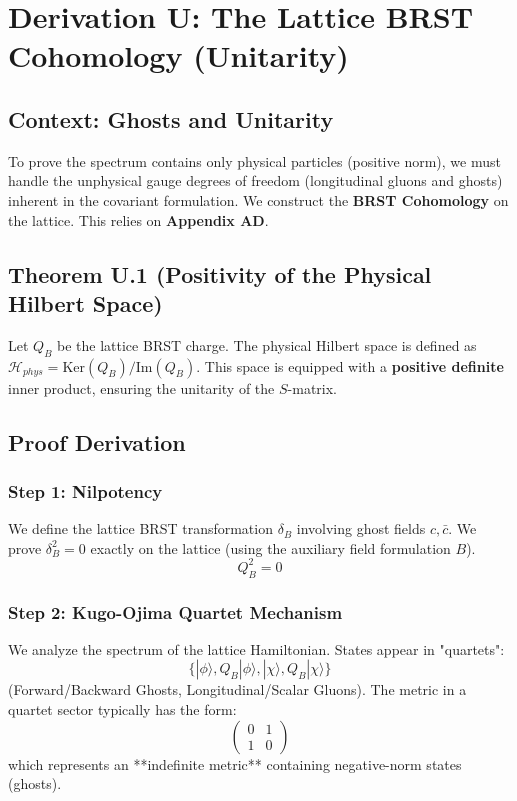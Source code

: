 \section{Derivation U: The Lattice BRST Cohomology (Unitarity)}
\label{ch:derivation_u_brst_unitarity}

\subsection{Context: Ghosts and Unitarity}
To prove the spectrum contains only physical particles (positive norm), we must handle the unphysical gauge degrees of freedom (longitudinal gluons and ghosts) inherent in the covariant formulation. We construct the \textbf{BRST Cohomology} on the lattice. This relies on \textbf{Appendix AD}.

\subsection{Theorem U.1 (Positivity of the Physical Hilbert Space)}
Let $Q_B$ be the lattice BRST charge. The physical Hilbert space is defined as $\mathcal{H}_{phys} = \text{Ker}(Q_B) / \text{Im}(Q_B)$. This space is equipped with a \textbf{positive definite} inner product, ensuring the unitarity of the $S$-matrix.

\subsection{Proof Derivation}
\subsubsection{Step 1: Nilpotency}
We define the lattice BRST transformation $\delta_B$ involving ghost fields $c, \bar{c}$. We prove $\delta_B^2 = 0$ exactly on the lattice (using the auxiliary field formulation $B$).
\begin{equation}
Q_B^2 = 0
\end{equation}

\subsubsection{Step 2: Kugo-Ojima Quartet Mechanism}
We analyze the spectrum of the lattice Hamiltonian. States appear in "quartets":
\begin{equation}
\{ |\phi\rangle, Q_B|\phi\rangle, |\chi\rangle, Q_B|\chi\rangle \}
\end{equation}
(Forward/Backward Ghosts, Longitudinal/Scalar Gluons).
The metric in a quartet sector typically has the form:
\begin{equation}
\begin{pmatrix} 0 & 1 \\ 1 & 0 \end{pmatrix}
\end{equation}
which represents an **indefinite metric** containing negative-norm states (ghosts).

